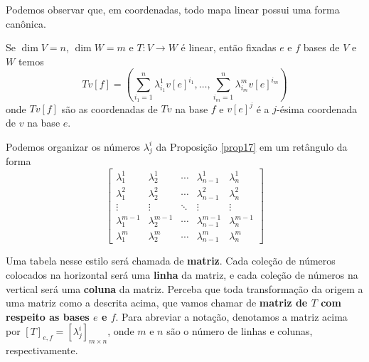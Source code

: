 Podemos observar que, em coordenadas, todo mapa linear possui uma forma canônica.

\begin{proposition}\label{prop17}
    Se $\dim V = n$, $\dim W = m$ e $T \colon V \to W$ é linear, então fixadas $e$ e $f$ bases de $V$ e $W$ temos \begin{equation}
        Tv[f] = \left(\sum_{i_1 = 1}^n \lambda^1_{i_1} v[e]^{i_1}, \dots, \sum_{i_m = 1}^n \lambda^m_{i_m} v[e]^{i_m}\right)
    \end{equation} onde $Tv[f]$ são as coordenadas de $Tv$ na base $f$ e $v[e]^j$ é a $j$-ésima coordenada de $v$ na base $e$.
\end{proposition}

Podemos organizar os números $\lambda^i_j$ da Proposição \ref{prop17} em um retângulo da forma \begin{equation}
    \begin{bmatrix}
        \lambda^1_1 & \lambda^1_2 & \cdots & \lambda^1_{n-1} & \lambda^1_n \\ \lambda^2_1 & \lambda^2_2 & \cdots & \lambda^2_{n-1} & \lambda^2_n \\ \vdots & \vdots & \ddots & \vdots & \vdots \\ \lambda^{m-1}_1 & \lambda^{m-1}_2 & \cdots & \lambda^{m-1}_{n-1} & \lambda^{m-1}_n \\  \lambda^m_1 & \lambda^m_2 & \cdots & \lambda^m_{n-1} & \lambda^m_n
    \end{bmatrix}
\end{equation}

Uma tabela nesse estilo será chamada de \textbf{matriz}. Cada coleção de números colocados na horizontal será uma \textbf{linha} da matriz, e cada coleção de números na vertical será uma \textbf{coluna} da matriz. Perceba que toda transformação da origem a uma matriz como a descrita acima, que vamos chamar de \textbf{matriz de $T$ com respeito as bases $e$ e $f$}. Para abreviar a notação, denotamos a matriz acima por $[T]_{e, f} = [\lambda^i_j]_{m \times n}$, onde $m$ e $n$ são o número de linhas e colunas, respectivamente.

